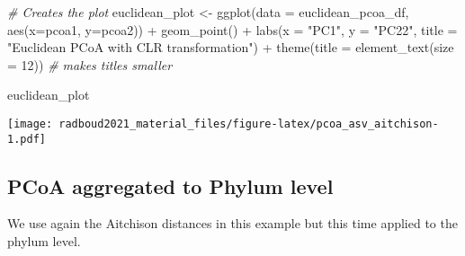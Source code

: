 \documentclass[
]{book}
\newenvironment{Shaded}{\begin{snugshade}}{\end{snugshade}}
\newcommand{\AttributeTok}[1]{\textcolor[rgb]{0.77,0.63,0.00}{#1}}
\newcommand{\CommentTok}[1]{\textcolor[rgb]{0.56,0.35,0.01}{\textit{#1}}}
\newcommand{\DecValTok}[1]{\textcolor[rgb]{0.00,0.00,0.81}{#1}}
\newcommand{\FunctionTok}[1]{\textcolor[rgb]{0.00,0.00,0.00}{#1}}
\newcommand{\NormalTok}[1]{#1}
\newcommand{\OtherTok}[1]{\textcolor[rgb]{0.56,0.35,0.01}{#1}}
\newcommand{\SpecialCharTok}[1]{\textcolor[rgb]{0.00,0.00,0.00}{#1}}
\newcommand{\StringTok}[1]{\textcolor[rgb]{0.31,0.60,0.02}{#1}}
\begin{document}
\begin{Shaded}
\begin{Highlighting}[]
\CommentTok{\# Creates the plot}
\NormalTok{euclidean\_plot }\OtherTok{\textless{}{-}} \FunctionTok{ggplot}\NormalTok{(}\AttributeTok{data =}\NormalTok{ euclidean\_pcoa\_df, }\FunctionTok{aes}\NormalTok{(}\AttributeTok{x=}\NormalTok{pcoa1, }\AttributeTok{y=}\NormalTok{pcoa2)) }\SpecialCharTok{+}
  \FunctionTok{geom\_point}\NormalTok{() }\SpecialCharTok{+}
  \FunctionTok{labs}\NormalTok{(}\AttributeTok{x =} \StringTok{"PC1"}\NormalTok{,}
       \AttributeTok{y =} \StringTok{"PC22"}\NormalTok{,}
       \AttributeTok{title =} \StringTok{"Euclidean PCoA with CLR transformation"}\NormalTok{) }\SpecialCharTok{+}
  \FunctionTok{theme}\NormalTok{(}\AttributeTok{title =} \FunctionTok{element\_text}\NormalTok{(}\AttributeTok{size =} \DecValTok{12}\NormalTok{)) }\CommentTok{\# makes titles smaller}

\NormalTok{euclidean\_plot}
\end{Highlighting}
\end{Shaded}

\texttt{[image: radboud2021\_material\_files/figure-latex/pcoa\_asv\_aitchison-1.pdf]}

\hypertarget{pcoa-aggregated-to-phylum-level}{%
\subsection{PCoA aggregated to Phylum level}\label{pcoa-aggregated-to-phylum-level}}

We use again the Aitchison distances in this example but this time applied to the phylum level.
\end{document}
